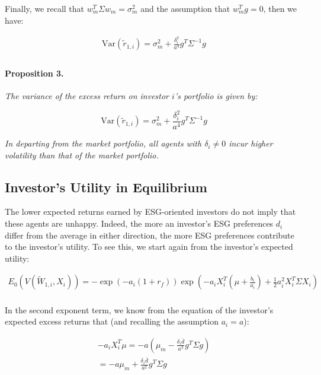 Finally, we recall that $w^T_m \Sigma w_m = \sigma^2_m$ and the assumption 
that $w_m^T g = 0$, then we have:

\begin{equation}
    \begin{aligned}
        \text{Var}(\tilde{r}_{1,i}) = \sigma^2_m + \frac{\delta_i^2}{a^4} g^T \Sigma^{-1} g \\
    \end{aligned}
\end{equation}

\paragraph{Proposition 3.} \textit{The variance of the excess return on
investor $i$'s portfolio is given by:}

\begin{equation}
    \text{Var}(\tilde{r}_{1,i}) = \sigma^2_m + \frac{\delta_i^2}{a^4} g^T \Sigma^{-1} g
\end{equation}

\textit{In departing from the market portfolio, all agents with $\delta_i \neq 0$
incur higher volatility than that of the market portfolio.}

\subsection{Investor's Utility in Equilibrium}

The lower expected returns earned by ESG-oriented investors 
do not imply that these agents are unhappy. Indeed, 
the more an investor's ESG preferences $d_i$ differ from the 
average in either direction, the more 
ESG preferences contribute to the investor's utility.
To see this, we start again from the investor's expected utility:


\begin{equation}
    \begin{aligned}
    E_0(V(\tilde{W}_{1,i}, X_i)) = 
     -\exp{(-a_i (1 + r_f))} \exp{(-a_i X_i^T (\mu + \frac{b_i}{a_i})+\frac{1}{2}a_i^2 X_i^T \Sigma X_i)} \\
    \end{aligned}
\end{equation}

In the second exponent term, we know from the equation 
of the investor's expected excess returns that (and recalling the assumption $a_i = a$):

\begin{equation}
    \begin{aligned}
    -a_iX_i^T \mu = -a (\mu_m - \frac{\delta_i \bar{d}}{a^3} g^T \Sigma g) \\
    = -a \mu_m + \frac{\delta_i \bar{d}}{a^2} g^T \Sigma g
    \end{aligned}
\end{equation}

